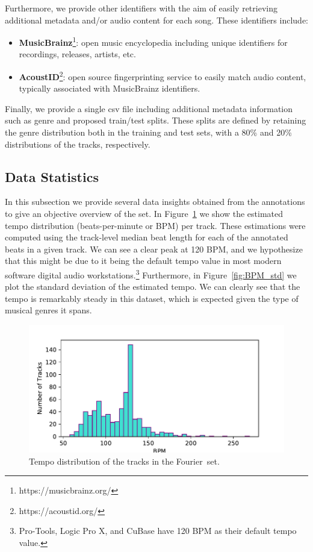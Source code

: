 \documentclass{article}
\newcommand{\setName}{Fourier}
\begin{document}
Furthermore, we provide other identifiers with the aim of easily retrieving additional metadata and/or audio content for each song.
These identifiers include:

\begin{itemize}
    \item \textbf{MusicBrainz}\footnote{https://musicbrainz.org/}: open music encyclopedia including unique identifiers for recordings, releases, artists, etc. 
    \item \textbf{AcoustID}\footnote{https://acoustid.org/}: open source fingerprinting service to easily match audio content, typically associated with MusicBrainz identifiers.
\end{itemize}

Finally, we provide a single csv file including additional metadata information such as genre and proposed train/test splits.
These splits are defined by retaining the genre distribution both in the training and test sets, with a 80\% and 20\% distributions of the tracks, respectively.

\subsection{Data Statistics}

In this subsection we provide several data insights obtained from the annotations to give an objective overview of the set.
In Figure~\ref{fig:BPM_dist} we show the estimated tempo distribution (beats-per-minute or BPM) per track.
These estimations were computed using the track-level median beat length for each of the annotated beats in a given track.
We can see a clear peak at 120 BPM, and we hypothesize that this might be due to it being the default tempo value in most modern software digital audio workstations.\footnote{Pro-Tools, Logic Pro X, and CuBase have 120 BPM as their default tempo value.}
Furthermore, in Figure~\ref{fig:BPM_std} we plot the standard deviation of the estimated tempo.
We can clearly see that the tempo is remarkably steady in this dataset, which is expected given the type of musical genres it spans.


\begin{figure}
    \centerline{\includegraphics[width=\columnwidth]{figs/BPM_distribution.pdf}}
    \caption{Tempo distribution of the tracks in the \setName~set.}
    \label{fig:BPM_dist}
\end{figure}
\end{document}
